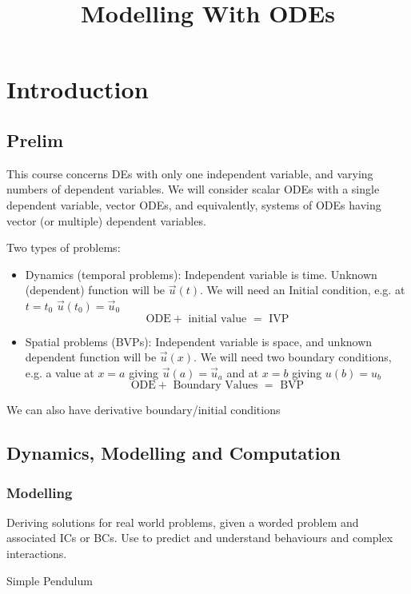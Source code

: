 \documentclass{X:/Documents/Coding/Latex/myassignment}
\title{Modelling With ODEs}
\begin{document}
\maketitle

\section{Introduction}
\subsection{Prelim}
This course concerns DEs with only one independent variable, and varying numbers of dependent variables. We will consider scalar ODEs with a single dependent variable, vector ODEs, and equivalently, systems of ODEs having vector (or multiple) dependent variables.


Two types of problems:
\begin{itemize}
    \item Dynamics (temporal problems): Independent variable is time. Unknown (dependent) function will be $\vec{u}(t)$. We will need an Initial condition, e.g. at $t=t_0$ $\vec u(t_0) = \vec u_0$
    \[\text{ODE} + \text{ initial value } = \text{ IVP}\]
    \item Spatial problems (BVPs): Independent variable is space, and unknown dependent function will be $\vec u(x)$. We will need two boundary conditions, e.g. a value at $x=a$ giving  $\vec u(a) = \vec u_a$ and at $x=b$ giving $u(b) = u_b$
    \[\text{ODE} + \text{ Boundary Values } = \text{ BVP}\]
\end{itemize}
We can also have derivative boundary/initial conditions

\subsection{Dynamics, Modelling and Computation}
\subsubsection{Modelling}
Deriving solutions for real world problems, given a worded problem and associated ICs or BCs. Use to predict and understand behaviours and complex interactions.

Simple Pendulum
\end{document}
